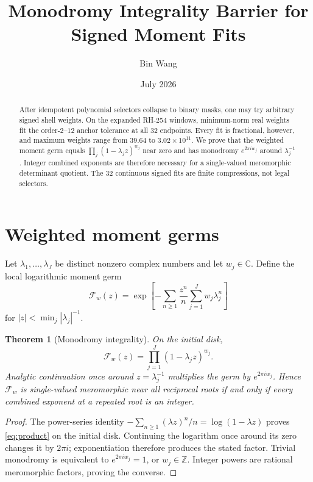 \documentclass[11pt]{article}
\title{Monodromy Integrality Barrier for Signed Moment Fits}
\author{Bin Wang}
\date{July 2026}
\newtheorem{theorem}{Theorem}[section]
\theoremstyle{remark}
\begin{document}
\maketitle

\begin{abstract}
After idempotent polynomial selectors collapse to binary masks, one may try
arbitrary signed shell weights.  On the expanded RH-254 windows, minimum-norm
real weights fit the order-$2$--$12$ anchor tolerance at all 32 endpoints.
Every fit is fractional, however, and maximum weights range from $39.64$ to
$3.02\times10^{11}$.  We prove that the weighted moment germ equals
$\prod_j(1-\lambda_jz)^{w_j}$ near zero and has monodromy
$e^{2\pi i w_j}$ around $\lambda_j^{-1}$.  Integer combined exponents are
therefore necessary for a single-valued meromorphic determinant quotient.
The 32 continuous signed fits are finite compressions, not legal selectors.
\end{abstract}

\section{Weighted moment germs}

Let $\lambda_1,\dots,\lambda_J$ be distinct nonzero complex numbers and let
$w_j\in\mathbb C$.  Define the local logarithmic moment germ
\begin{equation}
 \mathcal F_w(z)=\exp\left[-\sum_{n\ge1}\frac{z^n}{n}
 \sum_{j=1}^Jw_j\lambda_j^n\right]
 \label{eq:germ}
\end{equation}
for $|z|<\min_j|\lambda_j|^{-1}$.

\begin{theorem}[Monodromy integrality]
\label{thm:monodromy}
On the initial disk,
\begin{equation}
 \mathcal F_w(z)=\prod_{j=1}^J(1-\lambda_jz)^{w_j}.
 \label{eq:product}
\end{equation}
Analytic continuation once around $z=\lambda_j^{-1}$ multiplies the germ by
$e^{2\pi i w_j}$.  Hence $\mathcal F_w$ is single-valued meromorphic near all
reciprocal roots if and only if every combined exponent at a repeated root is
an integer.
\end{theorem}

\begin{proof}
The power-series identity
$-\sum_{n\ge1}(\lambda z)^n/n=\log(1-\lambda z)$ proves
\eqref{eq:product} on the initial disk.  Continuing the logarithm once around
its zero changes it by $2\pi i$; exponentiation therefore produces the stated
factor.  Trivial monodromy is equivalent to $e^{2\pi iw_j}=1$, or
$w_j\in\mathbb Z$.  Integer powers are rational meromorphic factors, proving
the converse.
\end{proof}
\end{document}
